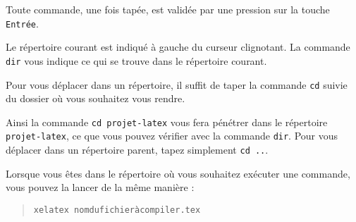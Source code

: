 Toute commande, une fois tapée, est validée par une pression sur la touche \verb|Entrée|.

Le répertoire courant est indiqué à gauche du curseur clignotant.
La commande \verb|dir| vous indique ce qui se trouve dans le répertoire
courant.

Pour vous déplacer dans un répertoire, il suffit de taper la commande
\verb|cd| suivie du dossier où vous souhaitez vous rendre.

Ainsi la commande \verb|cd projet-latex| vous fera pénétrer dans le
répertoire \verb|projet-latex|, ce que vous pouvez vérifier avec la
commande \verb|dir|. Pour vous déplacer dans un répertoire parent, tapez
simplement \verb|cd ..|.

Lorsque vous êtes dans le répertoire où vous souhaitez exécuter une
commande, vous pouvez la lancer de la même manière :

\begin{quote}
\verb|xelatex nomdufichieràcompiler.tex|
\end{quote}

